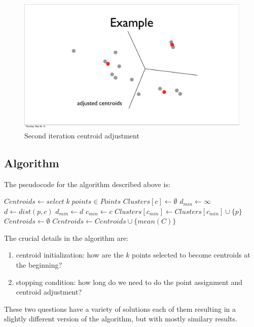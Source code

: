 \documentclass{article}
\begin{document}
\begin{figure}[H]
    \caption{Second iteration centroid adjustment}
    \includegraphics[scale=0.4]{kmeans-points-adjust2.pdf}
\end{figure}

\pagebreak

\subsection{Algorithm}

The pseudocode for the algorithm described above is:

\begin{algorithmic}[1]
    \State $Centroids\gets select\; k\; points \in Points$
            \State $Clusters[c]\gets \emptyset$
        \EndFor
            \State $d_{min}\gets \infty$
                \State $d\gets dist(p, c)$
                    \State $d_{min}\gets d$
                    \State $c_{min} \gets c$
                \EndIf
            \EndFor
            \State $Clusters[c_{min}]\gets Clusters[c_{min}] \cup \{p\}$
        \EndFor
        \State $Centroids\gets \emptyset$
            \State $Centroids\gets Centroids \cup \{mean(C)\}$
        \EndFor
    \EndWhile
\end{algorithmic}

The crucial details in the algorithm are:
\begin{enumerate}
    \item centroid initialization: how are the $k$ points selected to become
        centroids at the beginning?
    \item stopping condition: how long do we need to do the point assignment
        and centroid adjustment?
\end{enumerate}
These two questions have a variety of solutions each of them resulting in a
slightly different version of the algorithm, but with mostly similary results.
\end{document}
